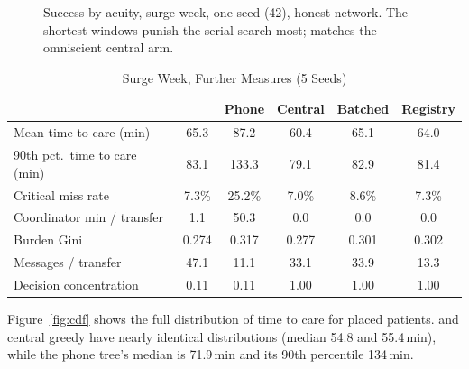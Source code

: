 \begin{figure}[!t]
\centering
{}
\caption{Success by acuity, surge week, one seed (42), honest network. The shortest windows punish the serial search most; \mahros{} matches the omniscient central arm.}
\label{fig:acuity}
\end{figure}

\begin{table}[!t]
\centering
\caption{Surge Week, Further Measures (5 Seeds)}
\label{tab:surge}
\scriptsize
\setlength{\tabcolsep}{2pt}
\begin{tabular}{@{}lccccc@{}}
\toprule
 & \mahros{} & Phone & Central & Batched & Registry \\
\midrule
Mean time to care (min)   & 65.3  & 87.2  & 60.4  & 65.1  & 64.0 \\
90th pct.\ time to care (min) & 83.1 & 133.3 & 79.1 & 82.9 & 81.4 \\
Critical miss rate & 7.3\% & 25.2\% & 7.0\% & 8.6\% & 7.3\% \\
Coordinator min / transfer & 1.1  & 50.3  & 0.0   & 0.0   & 0.0 \\
Burden Gini               & 0.274 & 0.317 & 0.277 & 0.301 & 0.302 \\
Messages / transfer       & 47.1  & 11.1  & 33.1  & 33.9  & 13.3 \\
Decision concentration    & 0.11  & 0.11  & 1.00  & 1.00  & 1.00 \\
\bottomrule
\end{tabular}
\end{table}

Figure~\ref{fig:cdf} shows the full distribution of time to care for placed patients. \mahros{} and central greedy have nearly identical distributions (median 54.8 and 55.4\,min), while the phone tree's median is 71.9\,min and its 90th percentile 134\,min.

